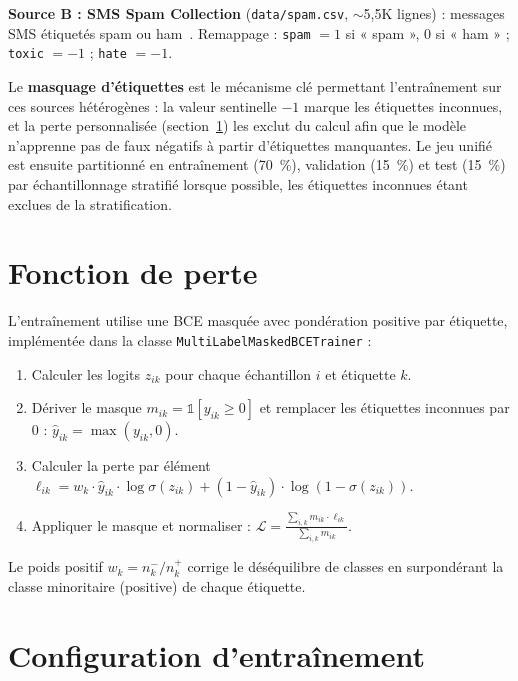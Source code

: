 \textbf{Source B : SMS Spam Collection} (\texttt{data/spam.csv}, $\sim$5,5K lignes) : messages SMS étiquetés spam ou ham~\cite{almeida2011bag}. Remappage : \texttt{spam} $= 1$ si « spam », $0$ si « ham » ; \texttt{toxic} $= -1$ ; \texttt{hate} $= -1$.

Le \textbf{masquage d'étiquettes} est le mécanisme clé permettant l'entraînement sur ces sources hétérogènes : la valeur sentinelle $-1$ marque les étiquettes inconnues, et la perte personnalisée (section~\ref{sec:text_loss}) les exclut du calcul afin que le modèle n'apprenne pas de faux négatifs à partir d'étiquettes manquantes. Le jeu unifié est ensuite partitionné en entraînement (70~\%), validation (15~\%) et test (15~\%) par échantillonnage stratifié lorsque possible, les étiquettes inconnues étant exclues de la stratification.

\section{Fonction de perte}
\label{sec:text_loss}

L'entraînement utilise une BCE masquée avec pondération positive par étiquette, implémentée dans la classe \texttt{MultiLabelMaskedBCETrainer} :

\begin{enumerate}[nosep]
  \item Calculer les logits $z_{ik}$ pour chaque échantillon $i$ et étiquette $k$.
  \item Dériver le masque $m_{ik} = \mathbb{1}[y_{ik} \geq 0]$ et remplacer les étiquettes inconnues par 0 : $\hat{y}_{ik} = \max(y_{ik}, 0)$.
  \item Calculer la perte par élément $\ell_{ik} = w_k \cdot \hat{y}_{ik} \cdot \log \sigma(z_{ik}) + (1 - \hat{y}_{ik}) \cdot \log (1 - \sigma(z_{ik}))$.
  \item Appliquer le masque et normaliser : $\mathcal{L} = \frac{\sum_{i,k} m_{ik} \cdot \ell_{ik}}{\sum_{i,k} m_{ik}}$.
\end{enumerate}

Le poids positif $w_k = n_k^{-} / n_k^{+}$ corrige le déséquilibre de classes en surpondérant la classe minoritaire (positive) de chaque étiquette.

\section{Configuration d'entraînement}


